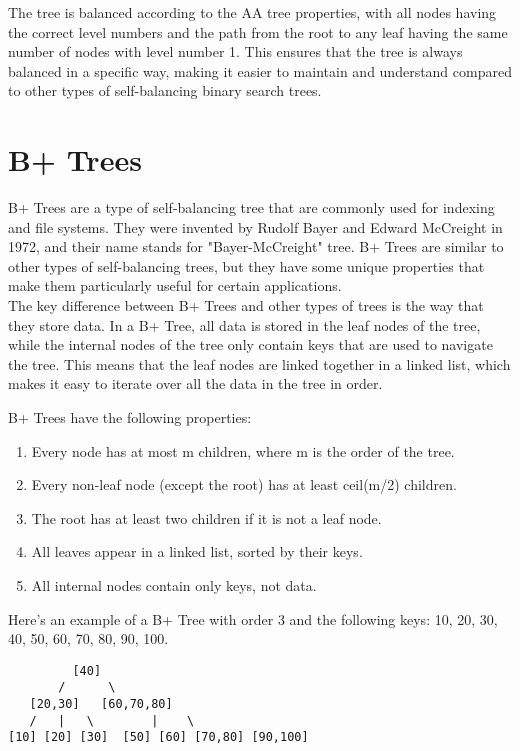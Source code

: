 \documentclass[11pt]{article}
\begin{document}
The tree is balanced according to the AA tree properties, with all nodes having the correct level numbers and the path from the root to any leaf having the same number of nodes with level number 1. This ensures that the tree is always balanced in a specific way, making it easier to maintain and understand compared to other types of self-balancing binary search trees.

\section{B+ Trees}

B+ Trees are a type of self-balancing tree that are commonly used for indexing and file systems. They were invented by Rudolf Bayer and Edward McCreight in 1972, and their name stands for "Bayer-McCreight" tree. B+ Trees are similar to other types of self-balancing trees, but they have some unique properties that make them particularly useful for certain applications.\\

The key difference between B+ Trees and other types of trees is the way that they store data. In a B+ Tree, all data is stored in the leaf nodes of the tree, while the internal nodes of the tree only contain keys that are used to navigate the tree. This means that the leaf nodes are linked together in a linked list, which makes it easy to iterate over all the data in the tree in order.

B+ Trees have the following properties:
\begin{enumerate}
    \item Every node has at most m children, where m is the order of the tree.
    \item Every non-leaf node (except the root) has at least ceil(m/2) children.
    \item The root has at least two children if it is not a leaf node.
    \item All leaves appear in a linked list, sorted by their keys.
    \item All internal nodes contain only keys, not data.
\end{enumerate}
Here's an example of a B+ Tree with order 3 and the following keys: 10, 20, 30, 40, 50, 60, 70, 80, 90, 100.

\begin{verbatim}
         [40]
       /      \
   [20,30]   [60,70,80]
   /   |   \        |    \
[10] [20] [30]  [50] [60] [70,80] [90,100]

\end{verbatim}
\end{document}
